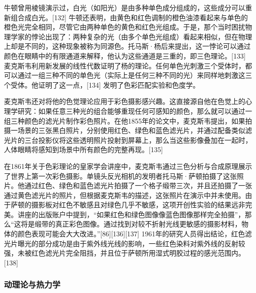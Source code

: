 牛顿曾用棱镜演示过，白光（如阳光）是由多种单色成分组成的，这些成分可以重新组合成白光。[132] 牛顿还表明，由黄色和红色调制的橙色油漆看起来与单色的橙色光完全相同，尽管它由两种单色的黄色和红色光组成。于是，那个当时困扰物理学家的悖论出现了：两种复杂的光（由多个单色光组成）看起来相似，但在物理上却是不同的，这种现象被称为同源色。托马斯·杨后来提出，这一悖论可以通过颜色在眼睛中的有限通道来解释，他认为这些通道是三重的，即三色理论。[133] 麦克斯韦利用新发展的线性代数证明了杨的理论。任何单色光刺激三个受体时，都可以通过一组三种不同的单色光（实际上是任何三种不同的光）来同样地刺激这三个受体。他证明了这一点，[134] 发明了色彩匹配实验和色度学。

麦克斯韦还对将他的色觉理论应用于彩色摄影感兴趣。这直接源自他在色觉上的心理学研究：如果任意三种光的组合能够重现任何可感知的颜色，那么就可以通过一组三种颜色的滤光片制作彩色照片。在他1855年的论文中，麦克斯韦提出，如果拍摄一场景的三张黑白照片，分别使用红色、绿色和蓝色滤光片，并通过配备类似滤光片的三台投影仪将这些透明照片投射到屏幕上，那么当这些影像叠加在一起时，人体眼睛将感知到场景中所有颜色的完整再现。[135]

在1861年关于色彩理论的皇家学会讲座中，麦克斯韦通过三色分析与合成原理展示了世界上第一次彩色摄影。单镜头反光相机的发明者托马斯·萨顿拍摄了这张照片。他通过红色、绿色和蓝色滤光片拍摄了一个格子缎带三次，并且还拍摄了一张通过黄色滤光片的照片，但根据麦克斯韦的描述，这张照片在演示中并未使用。由于萨顿的摄影板对红色不敏感且对绿色几乎不敏感，这项开创性实验的结果远非完美。讲座的出版账户中提到，“如果红色和绿色图像像蓝色图像那样完全拍摄”，那么“这将是缎带的真正彩色图像。通过找到对较不折射光线更敏感的摄影材料，物体的颜色表现可能会大大改进。”[86][136][137] 1961年的研究人员得出结论，红色滤光片曝光的部分成功是由于紫外线光线的影响，一些红色染料对紫外线的反射较强，未被红色滤光片完全阻挡，并且位于萨顿所用湿式明胶过程的感光范围内。[138]
\subsubsection{动理论与热力学}